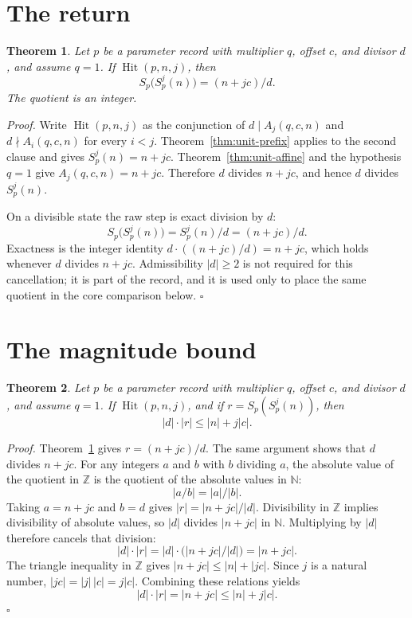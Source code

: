 \documentclass[11pt,letterpaper]{article}
\newcommand{\N}{\mathbb{N}}
\newcommand{\Z}{\mathbb{Z}}
\newtheorem{theorem}{Theorem}
\newenvironment{proof}{\noindent\textit{Proof.}}{\hfill\(\square\)}
\begin{document}
\section{The return}

\begin{theorem}
\label{thm:unit-return}
Let \(p\) be a parameter record with multiplier \(q\), offset \(c\), and
divisor \(d\), and assume \(q=1\). If \(\operatorname{Hit}(p,n,j)\), then
\[
S_p\bigl(S_p^{j}(n)\bigr)=(n+jc)/d.
\]
The quotient is an integer.
\end{theorem}

\begin{proof}
Write \(\operatorname{Hit}(p,n,j)\) as the conjunction of
\(d\mid A_j(q,c,n)\) and \(d\nmid A_i(q,c,n)\) for every \(i<j\).
Theorem~\ref{thm:unit-prefix} applies to the second clause and gives
\(S_p^{j}(n)=n+jc\). Theorem~\ref{thm:unit-affine} and the hypothesis \(q=1\)
give \(A_j(q,c,n)=n+jc\). Therefore \(d\) divides \(n+jc\), and hence \(d\)
divides \(S_p^{j}(n)\).

On a divisible state the raw step is exact division by \(d\):
\[
S_p\bigl(S_p^{j}(n)\bigr)=S_p^{j}(n)/d=(n+jc)/d.
\]
Exactness is the integer identity \(d\cdot((n+jc)/d)=n+jc\), which holds
whenever \(d\) divides \(n+jc\). Admissibility \(|d|\ge 2\) is not required for
this cancellation; it is part of the record, and it is used only to place the
same quotient in the core comparison below.
\end{proof}

\section{The magnitude bound}

\begin{theorem}
\label{thm:unit-magnitude}
Let \(p\) be a parameter record with multiplier \(q\), offset \(c\), and
divisor \(d\), and assume \(q=1\). If \(\operatorname{Hit}(p,n,j)\), and if
\(r=S_p(S_p^{j}(n))\), then
\[
|d|\cdot|r|\le |n|+j|c|.
\]
\end{theorem}

\begin{proof}
Theorem~\ref{thm:unit-return} gives \(r=(n+jc)/d\). The same argument shows
that \(d\) divides \(n+jc\). For any integers \(a\) and \(b\) with \(b\)
dividing \(a\), the absolute value of the quotient in \(\Z\) is the
quotient of the absolute values in \(\N\):
\[
|a/b|=|a|/|b|.
\]
Taking \(a=n+jc\) and \(b=d\) gives \(|r|=|n+jc|/|d|\). Divisibility in
\(\Z\) implies divisibility of absolute values, so \(|d|\) divides
\(|n+jc|\) in \(\N\). Multiplying by \(|d|\) therefore cancels that
division:
\[
|d|\cdot|r|=|d|\cdot\bigl(|n+jc|/|d|\bigr)=|n+jc|.
\]
The triangle inequality in \(\Z\) gives \(|n+jc|\le |n|+|jc|\). Since \(j\) is
a natural number, \(|jc|=|j|\,|c|=j|c|\). Combining these relations yields
\[
|d|\cdot|r|=|n+jc|\le |n|+j|c|.
\]
\end{proof}
\end{document}

